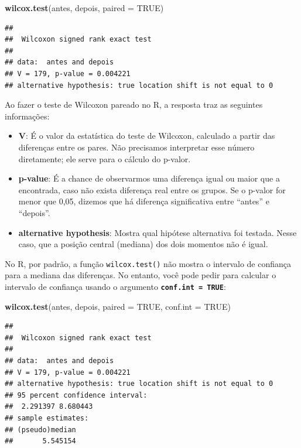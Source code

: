 \documentclass[
]{book}
\newenvironment{Shaded}{\begin{snugshade}}{\end{snugshade}}
\newcommand{\AttributeTok}[1]{\textcolor[rgb]{0.13,0.29,0.53}{#1}}
\newcommand{\ConstantTok}[1]{\textcolor[rgb]{0.56,0.35,0.01}{#1}}
\newcommand{\FunctionTok}[1]{\textcolor[rgb]{0.13,0.29,0.53}{\textbf{#1}}}
\newcommand{\NormalTok}[1]{#1}
\providecommand{\tightlist}{%
  \setlength{\itemsep}{0pt}\setlength{\parskip}{0pt}}
\begin{document}
\begin{Shaded}
\begin{Highlighting}[]
\FunctionTok{wilcox.test}\NormalTok{(antes, depois, }\AttributeTok{paired =} \ConstantTok{TRUE}\NormalTok{)}
\end{Highlighting}
\end{Shaded}

\begin{verbatim}
## 
##  Wilcoxon signed rank exact test
## 
## data:  antes and depois
## V = 179, p-value = 0.004221
## alternative hypothesis: true location shift is not equal to 0
\end{verbatim}

Ao fazer o teste de Wilcoxon pareado no R, a resposta traz as seguintes informações:

\begin{itemize}
\tightlist
\item
  \textbf{V}: É o valor da estatística do teste de Wilcoxon, calculado a partir das diferenças entre os pares. Não precisamos interpretar esse número diretamente; ele serve para o cálculo do p-valor.
\item
  \textbf{p-value}: É a chance de observarmos uma diferença igual ou maior que a encontrada, caso não exista diferença real entre os grupos. Se o p-valor for menor que 0,05, dizemos que há diferença significativa entre ``antes'' e ``depois''.
\item
  \textbf{alternative hypothesis}: Mostra qual hipótese alternativa foi testada. Nesse caso, que a posição central (mediana) dos dois momentos não é igual.
\end{itemize}

No R, por padrão, a função \texttt{wilcox.test()} não mostra o intervalo de confiança para a mediana das diferenças.
No entanto, você pode pedir para calcular o intervalo de confiança usando o argumento \textbf{\texttt{conf.int\ =\ TRUE}}:

\begin{Shaded}
\begin{Highlighting}[]
\FunctionTok{wilcox.test}\NormalTok{(antes, depois, }\AttributeTok{paired =} \ConstantTok{TRUE}\NormalTok{, }\AttributeTok{conf.int =} \ConstantTok{TRUE}\NormalTok{)}
\end{Highlighting}
\end{Shaded}

\begin{verbatim}
## 
##  Wilcoxon signed rank exact test
## 
## data:  antes and depois
## V = 179, p-value = 0.004221
## alternative hypothesis: true location shift is not equal to 0
## 95 percent confidence interval:
##  2.291397 8.680443
## sample estimates:
## (pseudo)median 
##       5.545154
\end{verbatim}
\end{document}
